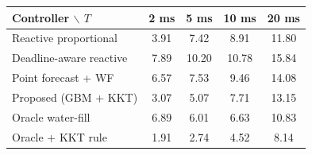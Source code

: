 \begin{tabular}{lcccc}
\hline
Controller $\backslash$ $T$ & 2 ms & 5 ms & 10 ms & 20 ms \\
\hline
Reactive proportional & 3.91 & 7.42 & 8.91 & 11.80 \\
Deadline-aware reactive & 7.89 & 10.20 & 10.78 & 15.84 \\
Point forecast + WF & 6.57 & 7.53 & 9.46 & 14.08 \\
Proposed (GBM + KKT) & 3.07 & 5.07 & 7.71 & 13.15 \\
Oracle water-fill & 6.89 & 6.01 & 6.63 & 10.83 \\
Oracle + KKT rule & 1.91 & 2.74 & 4.52 & 8.14 \\
\hline
\end{tabular}
